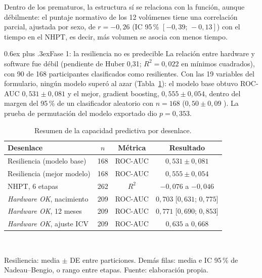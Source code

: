 \documentclass[conference,letterpaper,10pt]{IEEEtran}
\makeatletter
\def\subsection{\@startsection{subsection}{2}{\z@}{1.5ex plus 1ex minus .5ex}%
  {0.6ex plus .3ex}{\normalfont\normalsize\bfseries}}
\makeatother
\begin{document}
Dentro de los prematuros, la estructura sí se relaciona con la función, aunque débilmente: el puntaje normativo de los 12 volúmenes tiene una correlación parcial, ajustada por sexo, de $r=-0{,}26$ (IC 95\,\% $[-0{,}39;\,-0{,}13]$) con el tiempo en el NHPT, es decir, más volumen se asocia con menos tiempo.

\subsection{Fase 1: la resiliencia no es predecible}
La relación entre hardware y software fue débil (pendiente de Huber 0,31; $R^2=0{,}022$ en mínimos cuadrados), con 90 de 168 participantes clasificados como resilientes. Con las 19 variables del formulario, ningún modelo superó al azar (Tabla~\ref{tab:modelos}): el modelo base obtuvo ROC-AUC $0{,}531\pm 0{,}081$ y el mejor, gradient boosting, $0{,}555\pm 0{,}054$, dentro del margen del 95\,\% de un clasificador aleatorio con $n=168$ ($0{,}50\pm 0{,}09$ \cite{hanley1982}). La prueba de permutación del modelo exportado dio $p=0{,}353$.

\begin{table}[t]
\caption{Resumen de la capacidad predictiva por desenlace.}
\label{tab:modelos}
\centering
\footnotesize
\setlength{\tabcolsep}{3pt}
\begin{tabular}{@{}lccc@{}}
\toprule
Desenlace & $n$ & Métrica & Resultado \\
\midrule
Resiliencia (modelo base) & 168 & ROC-AUC & $0{,}531 \pm 0{,}081$ \\
Resiliencia (mejor modelo) & 168 & ROC-AUC & $0{,}555 \pm 0{,}054$ \\
NHPT, 6 etapas & 262 & $R^2$ & $-0{,}076$ a $-0{,}046$ \\
\emph{Hardware OK}, nacimiento & 209 & ROC-AUC & $0{,}703$ [$0{,}631$; $0{,}775$] \\
\emph{Hardware OK}, 12 meses & 209 & ROC-AUC & $0{,}771$ [$0{,}690$; $0{,}853$] \\
\emph{Hardware OK}, ajuste ICV & 209 & ROC-AUC & $0{,}635$ a $0{,}668$ \\
\bottomrule
\end{tabular}\\[2pt]
\parbox{\columnwidth}{\scriptsize Resiliencia: media $\pm$ DE entre particiones. Demás filas: media e IC 95\,\% de Nadeau--Bengio, o rango entre etapas. Fuente: elaboración propia.}
\end{table}
\end{document}

